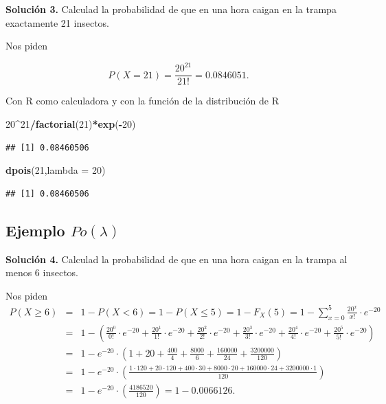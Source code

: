 \documentclass[]{book}
\newenvironment{Shaded}{\begin{snugshade}}{\end{snugshade}}
\newcommand{\DataTypeTok}[1]{\textcolor[rgb]{0.13,0.29,0.53}{#1}}
\newcommand{\DecValTok}[1]{\textcolor[rgb]{0.00,0.00,0.81}{#1}}
\newcommand{\KeywordTok}[1]{\textcolor[rgb]{0.13,0.29,0.53}{\textbf{#1}}}
\newcommand{\NormalTok}[1]{#1}
\newcommand{\OperatorTok}[1]{\textcolor[rgb]{0.81,0.36,0.00}{\textbf{#1}}}
\begin{document}
\textbf{Solución 3.} Calculad la probabilidad de que en una hora caigan en la trampa exactamente 21 insectos.

Nos piden

\[
P(X=21)=\frac{20^{21}}{21!}=0.0846051.
\]

Con R como calculadora y con la función de la distribución de R

\begin{Shaded}
\begin{Highlighting}[]
\DecValTok{20}\OperatorTok{^}\DecValTok{21}\OperatorTok{/}\KeywordTok{factorial}\NormalTok{(}\DecValTok{21}\NormalTok{)}\OperatorTok{*}\KeywordTok{exp}\NormalTok{(}\OperatorTok{-}\DecValTok{20}\NormalTok{)}
\end{Highlighting}
\end{Shaded}

\begin{verbatim}
## [1] 0.08460506
\end{verbatim}

\begin{Shaded}
\begin{Highlighting}[]
\KeywordTok{dpois}\NormalTok{(}\DecValTok{21}\NormalTok{,}\DataTypeTok{lambda =} \DecValTok{20}\NormalTok{)}
\end{Highlighting}
\end{Shaded}

\begin{verbatim}
## [1] 0.08460506
\end{verbatim}

\hypertarget{ejemplo-polambda-5}{%
\subsection{\texorpdfstring{Ejemplo \(Po(\lambda)\)}{Ejemplo Po(\textbackslash{}lambda)}}\label{ejemplo-polambda-5}}

\textbf{Solución 4.} Calculad la probabilidad de que en una hora caigan en la trampa al menos 6 insectos.

Nos piden
\[
\begin{eqnarray*}
 P(X\geq 6)&=&1- P(X<6)=1-P(X\leq 5)=1-F_X(5)=1-\displaystyle\sum_{x=0}^{5} \frac{20^{x}}{x!}\cdot e^{-20}\\
 &=&
 1-\left(\frac{20^{0}}{0!}\cdot e^{-20}+\frac{20^{1}}{1!}\cdot e^{-20}+\frac{20^{2}}{2!}\cdot e^{-20}+\frac{20^{3}}{3!}\cdot e^{-20}+\frac{20^{4}}{4!}\cdot e^{-20}+\frac{20^{5}}{5!}\cdot e^{-20}\right)\\
 &=&
 1-e^{-20}\cdot \left(1+20+\frac{400}{4}+\frac{8000}{6}+\frac{160000}{24}+\frac{3200000}{120}\right)\\
 &=&
 1-e^{-20} \cdot \left(\frac{1 \cdot 120+20\cdot 120+400\cdot 30+8000\cdot 20+160000\cdot 24+3200000\cdot 1}{120}\right)\\
 &=& 1-e^{-20}\cdot\left(\frac{4186520}{120}\right)=1-0.0066126.
\end{eqnarray*}
\]
\end{document}
